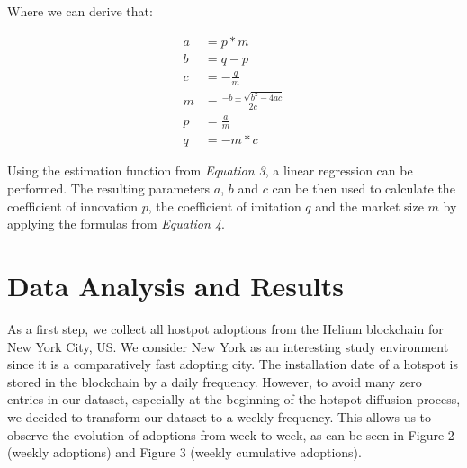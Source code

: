 \documentclass{article}
\begin{document}
\noindent Where we can derive that:

\begin{equation}
    \begin{aligned}
    a & = p*m \\[2pt]
    b & = q - p \\[2pt]
    c & = - \frac{q}{m} \\[15pt]
    m & = \frac{-b \pm \sqrt{b^2 -4ac}}{2c} \\
    p & = \frac{a}{m} \\[2pt]
    q & = -m*c
    \end{aligned}
\end{equation}

\bigskip

\noindent Using the estimation function from \emph{Equation 3}, a linear regression can be performed. The resulting parameters $a$, $b$ and $c$ can be
then used to calculate the coefficient of innovation $p$, the coefficient of imitation $q$ and the market size $m$ by applying the formulas from \emph{Equation 4}.

\clearpage
\section{Data Analysis and Results}

As a first step, we collect all hostpot adoptions from the Helium blockchain for New York City, US. We consider New York as an interesting study
environment since it is a comparatively fast adopting city. The installation date of a hotspot is stored in the blockchain by a daily frequency. However, to
avoid many zero entries in our dataset, especially at the beginning of the hotspot diffusion process, we decided to transform our dataset to a weekly frequency.
This allows us to observe the evolution of adoptions from week to week, as can be seen in Figure 2 (weekly adoptions) and Figure 3 (weekly cumulative adoptions).
\end{document}
